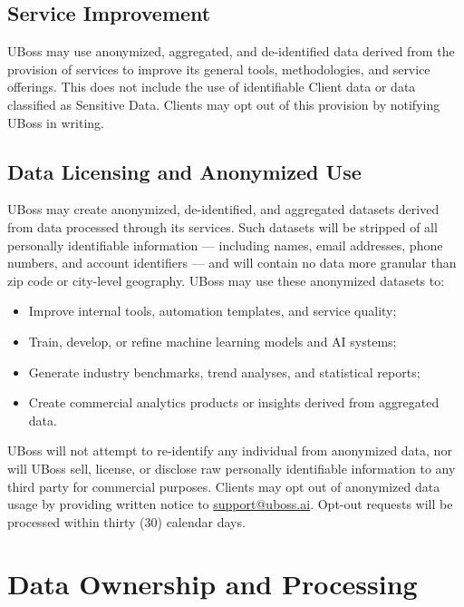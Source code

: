 \documentclass[11pt,letterpaper,parskip=half]{scrartcl}
\begin{document}
\subsection{Service Improvement}

UBoss may use anonymized, aggregated, and de-identified data derived from the provision of services to improve its general tools, methodologies, and service offerings. This does not include the use of identifiable Client data or data classified as Sensitive Data. Clients may opt out of this provision by notifying UBoss in writing.

\subsection{Data Licensing and Anonymized Use}

UBoss may create anonymized, de-identified, and aggregated datasets derived from data processed through its services. Such datasets will be stripped of all personally identifiable information --- including names, email addresses, phone numbers, and account identifiers --- and will contain no data more granular than zip code or city-level geography. UBoss may use these anonymized datasets to:

\begin{itemize}[nosep, leftmargin=1.5em]
    \item Improve internal tools, automation templates, and service quality;
    \item Train, develop, or refine machine learning models and AI systems;
    \item Generate industry benchmarks, trend analyses, and statistical reports;
    \item Create commercial analytics products or insights derived from aggregated data.
\end{itemize}

UBoss will not attempt to re-identify any individual from anonymized data, nor will UBoss sell, license, or disclose raw personally identifiable information to any third party for commercial purposes. Clients may opt out of anonymized data usage by providing written notice to \href{mailto:support@uboss.ai}{support@uboss.ai}. Opt-out requests will be processed within thirty (30) calendar days.

\section{Data Ownership and Processing}
\end{document}
